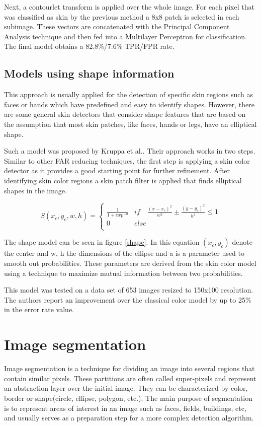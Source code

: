 \documentclass[12pt]{report}
\begin{document}
 	Next, a contourlet transform is applied over the whole image. For each pixel that was classified as skin by the previous method a 8x8 patch is selected in each subimage. These vectors are concatenated with the Principal Component Analysis technique and then fed into a Multilayer Perceptron for classification. The final model obtains a 82.8\%/7.6\% TPR/FPR rate.
 	
 	\subsection{Models using shape information}
 	This approach is usually applied for the detection of specific skin regions such as faces\cite{face_detection_shape} or hands\cite{hand_detection_shape} which have predefined and easy to identify shapes. However, there are some general skin detectors that consider shape features that are based on the assumption that most skin patches, like faces, hands or legs, have an elliptical shape.
 	
 	Such a model was proposed by Kruppa et al.\cite{skin_detection_shape}. Their approach works in two steps. Similar to other FAR reducing techniques, the first step is applying a skin color detector as it provides a good starting point for further refinement. After identifying skin color regions a skin patch filter is applied that finds elliptical shapes in the image.
 	
 	\begin{equation} \label{shape}
 	S(x_c, y_c, w, h) =  \left\{
 	\begin{array}{ll}
 	\frac{1}{1+exp^{-a}} & if \quad \frac{(x-x_c)^2}{w^2} \pm \frac{(y-y_c)^2}{h^2} \le 1\\
 	0 & else \\
 	\end{array} 
 	\right. 
 	\end{equation}
 	
 	The shape model can be seen in figure \ref{shape}. In this equation $(x_c,y_c)$ denote the center and w, h the dimensions of the ellipse and a is a parameter used to smooth out probabilities. These parameters are derived from the skin color model using a technique to maximize mutual information between two probabilities.
 	
 	This model was tested on a data set of 653 images resized to 150x100 resolution. The authors report an improvement over the classical color model by up to 25\% in the error rate value.
 
	\section{Image segmentation}
	Image segmentation is a technique for dividing an image into several regions that contain similar pixels. These partitions are often called super-pixels and represent an abstraction layer over the initial image. They can be characterized by color, border or shape(circle, ellipse, polygon, etc.)\cite{computer_vision_book}. The main purpose of segmentation is to represent areas of interest in an image such as faces, fields, buildings, etc, and usually serves as a preparation step for a more complex detection algorithm.
	
\end{document}
